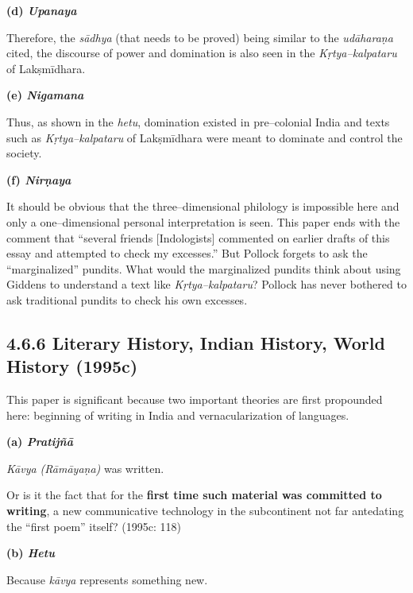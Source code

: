 \textbf{(d) \textit{Upanaya}}

Therefore, the \textit{sādhya} (that needs to be proved) being similar to the \textit{udāharaṇa} cited, the discourse of power and domination is also seen in the \textit{Kṛtya–kalpataru} of Lakṣmīdhara.

\newpage

\textbf{(e) \textit{Nigamana}}

Thus, as shown in the \textit{hetu}, domination existed in pre–colonial India and texts such as \textit{Kṛtya–kalpataru }of Lakṣmīdhara were meant to dominate and control the society.

\textbf{(f) \textit{Nirṇaya}}

It should be obvious that the three–dimensional philology is impossible here and only a one–dimensional personal interpretation is seen. This paper ends with the comment that “several friends [Indologists] commented on earlier drafts of this essay and attempted to check my excesses.” But Pollock forgets to ask the “marginalized” pundits. What would the marginalized pundits think about using Giddens to understand a text like \textit{Kṛtya–kalpataru}? Pollock has never bothered to ask traditional pundits to check his own excesses.

\vspace{-.3cm}

\subsection*{4.6.6 Literary History, Indian History, World History (1995c)}

\vspace{-.2cm}

This paper is significant because two important theories are first propounded here: beginning of writing in India and vernacularization of languages.

\textbf{(a) \textit{Pratijñā}}

\textit{Kāvya (Rāmāyaṇa)} was written.

\begin{myquote}
Or is it the fact that for the \textbf{first time such material was committed to writing}, a new communicative technology in the subcontinent not far antedating the “first poem” itself? (1995c: 118)
\end{myquote}

\textbf{(b) \textit{Hetu}}

Because\textit{ kāvya} represents something new.

